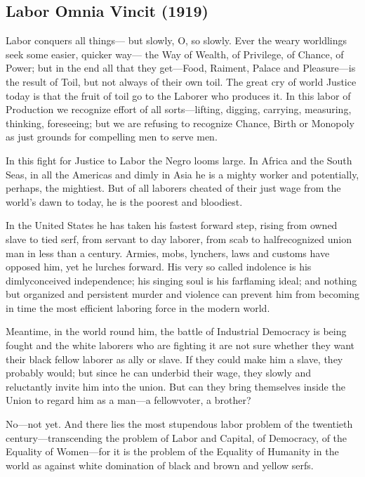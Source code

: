 \documentclass[letterpaper,10pt,english]{jupyterBook}
\begin{document}
\subsection{Labor Omnia Vincit (1919)}
\label{\detokenize{Volumes/18/05/labor_omnia_vincit:labor-omnia-vincit-1919}}\label{\detokenize{Volumes/18/05/labor_omnia_vincit::doc}}
\sphinxAtStartPar
Labor conquers all things— but slowly, O, so slowly. Ever the weary worldlings seek some easier, quicker way— the Way of Wealth, of Privilege, of Chance, of Power; but in the end all that they get—Food, Raiment, Palace and Pleasure—is the result of Toil, but not always of their own toil. The great cry of world Justice today is that the fruit of toil go to the Laborer who produces it. In this labor of Production we recognize effort of all sorts—lifting, digging, carrying, measuring, thinking, foreseeing; but we are refusing to recognize Chance, Birth or Monopoly as just grounds for compelling men to serve men.

\sphinxAtStartPar
In this fight for Justice to Labor the Negro looms large. In Africa and the South Seas, in all the Americas and dimly in Asia he is a mighty worker and potentially, perhaps, the mightiest. But of all laborers cheated of their just wage from the world’s dawn to today, he is the poorest and bloodiest.

\sphinxAtStartPar
In the United States he has taken his fastest forward step, rising from owned slave to tied serf, from servant to day laborer, from scab to half\sphinxhyphen{}recognized union man in less than a century. Armies, mobs, lynchers, laws and customs have opposed him, yet he lurches forward. His very so called indolence is his dimly\sphinxhyphen{}conceived independence; his singing soul is his far\sphinxhyphen{}flaming ideal; and nothing but organized and persistent murder and violence can prevent him from becoming in time the most efficient laboring force in the modern world.

\sphinxAtStartPar
Meantime, in the world round him, the battle of Industrial Democracy is being fought and the white laborers who are fighting it are not sure whether they want their black fellow laborer as ally or slave. If they could make him a slave, they probably would; but since he can underbid their wage, they slowly and reluctantly invite him into the union. But can they bring themselves inside the Union to regard him as a man—a fellow\sphinxhyphen{}voter, a brother?

\sphinxAtStartPar
No—not yet. And there lies the most stupendous labor problem of the twentieth century—transcending the problem of Labor and Capital, of Democracy, of the Equality of Women—for it is the problem of the Equality of Humanity in the world as against white domination of black and brown and yellow serfs.
\end{document}
